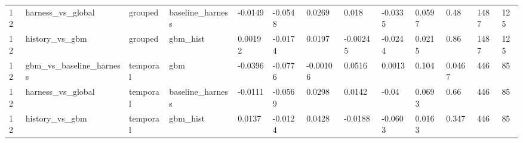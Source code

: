 \begin{tabular}{lllllllllllll}
12 & harness\_vs\_global & grouped & baseline\_harness & -0.0149 & -0.0548 & 0.0269 & 0.018 & -0.0335 & 0.0597 & 0.48 & 1487 & 125 \\
12 & history\_vs\_gbm & grouped & gbm\_hist & 0.00192 & -0.0174 & 0.0197 & -0.00245 & -0.0244 & 0.0215 & 0.86 & 1487 & 125 \\
12 & gbm\_vs\_baseline\_harness & temporal & gbm & -0.0396 & -0.0776 & -0.00106 & 0.0516 & 0.0013 & 0.104 & 0.0467 & 446 & 85 \\
12 & harness\_vs\_global & temporal & baseline\_harness & -0.0111 & -0.0569 & 0.0298 & 0.0142 & -0.04 & 0.0693 & 0.66 & 446 & 85 \\
12 & history\_vs\_gbm & temporal & gbm\_hist & 0.0137 & -0.0124 & 0.0428 & -0.0188 & -0.0603 & 0.0163 & 0.347 & 446 & 85 \\
\bottomrule
\end{tabular}